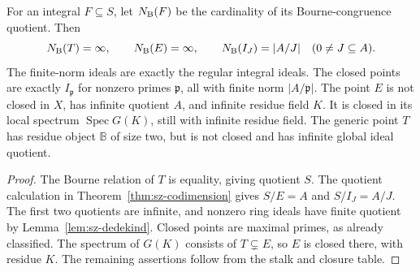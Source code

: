 \begin{theorem}\label{thm:sz-norms}
For an integral \(F\subseteq S\), let \(N_{\rm B}(F)\) be the
cardinality of its Bourne-congruence quotient. Then
\begin{equation}\label{eq:sz-all-norms}
 N_{\rm B}(T)=\infty,\qquad N_{\rm B}(E)=\infty,\qquad
 N_{\rm B}(I_J)=|A/J|\quad(0\ne J\subseteq A).
\end{equation}
The finite-norm ideals are exactly the regular integral ideals.
The closed points are exactly \(I_{\mathfrak p}\) for nonzero
primes \(\mathfrak p\), all with finite norm \(|A/\mathfrak p|\).
The point \(E\) is not closed in \(X\), has infinite quotient \(A\),
and infinite residue field \(K\). It is closed in its local spectrum
\(\operatorname{Spec}G(K)\), still with infinite residue field.
The generic point \(T\) has residue object \(\mathbb B\) of size
two, but is not closed and has infinite global ideal quotient.
\end{theorem}
\begin{proof}
The Bourne relation of \(T\) is equality, giving quotient \(S\).
The quotient calculation in Theorem~\ref{thm:sz-codimension}
gives \(S/E=A\) and \(S/I_J=A/J\). The first two quotients are
infinite, and nonzero ring ideals have finite quotient by
Lemma~\ref{lem:sz-dedekind}. Closed points are maximal primes,
as already classified. The spectrum of \(G(K)\) consists of
\(T\subsetneq E\), so \(E\) is closed there, with residue \(K\).
The remaining assertions follow from the stalk and closure table.
\end{proof}

